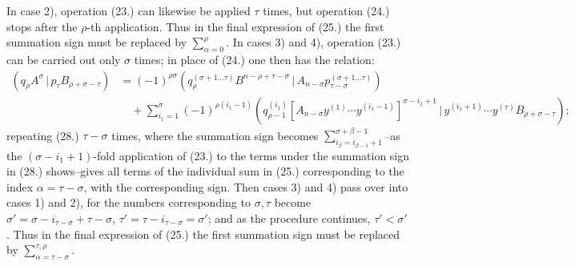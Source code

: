 \documentclass[11pt]{article}
\newcommand{\pair}[2]{(#1\,|\,#2)}
\begin{document}
In case 2), operation (23.) can likewise be applied $\tau$ times, but operation (24.) stops after the $\rho$-th application. Thus in the final expression of (25.) the first summation sign must be replaced by $\sum_{\alpha=0}^{\rho}$. In cases 3) and 4), operation (23.) can be carried out only $\sigma$ times; in place of (24.) one then has the relation:
\begin{equation}
\begin{aligned}
\pair{q_\rho A^\sigma}{p_\tau B_{\rho+\sigma-\tau}}
&=(-1)^{\rho\sigma}
 \pair{q_\rho^{(\sigma+1\ldots\tau)}B^{n-\rho+\tau-\sigma}}{A_{n-\sigma}p_{\tau-\sigma}^{(\sigma+1\ldots\tau)}}\\
&\quad+\sum_{i_1=1}^{\sigma}(-1)^{\rho(i_1-1)}
 \pair{q_{\rho-1}^{(i_1)}[A_{n-\sigma}y^{(1)}\cdots y^{(i_1-1)}]^{\sigma-i_1+1}}
 {y^{(i_1+1)}\cdots y^{(\tau)}B_{\rho+\sigma-\tau}};
\end{aligned}
\tag{28}
\end{equation}
repeating (28.) $\tau-\sigma$ times, where the summation sign becomes $\sum_{i_\beta=i_{\beta-1}+1}^{\sigma+\beta-1}$--as the $(\sigma-i_1+1)$-fold application of (23.) to the terms under the summation sign in (28.) shows--gives all terms of the individual sum in (25.) corresponding to the index $\alpha=\tau-\sigma$, with the corresponding sign. Then cases 3) and 4) pass over into cases 1) and 2), for the numbers corresponding to $\sigma,\tau$ become $\sigma'=\sigma-i_{\tau-\sigma}+\tau-\sigma$, $\tau'=\tau-i_{\tau-\sigma}=\sigma'$; and as the procedure continues, $\tau'<\sigma'$. Thus in the final expression of (25.) the first summation sign must be replaced by $\sum_{\alpha=\tau-\sigma}^{\tau,\rho}$.
\end{document}
